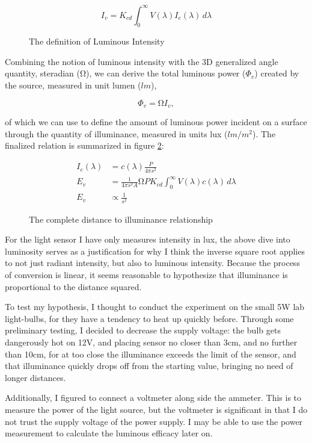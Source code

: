 \documentclass[a4paper,12pt]{article}
\begin{document}
\begin{figure}[h!]
    \[
     I_v = K_{cd} \int_{0}^{\infty} V(\lambda) I_e(\lambda) \, d\lambda
    \]
    \caption{The definition of Luminous Intensity}
    \label{eq:li}
\end{figure}

Combining the notion of luminous intensity with the 3D generalized angle quantity, steradian ($\si{\ohm}$), we can derive the total luminous power ($\Phi_v$) created by the source, measured in unit lumen ($\si{lm}$),

\[
    \Phi_v = \si{\ohm} I_v,
\]

of which we can use to define the amount of luminous power incident on a surface through the quantity of illuminance, measured in units lux ($\si{lm\per m^2}$). The finalized relation is summarized in figure \ref{eq:dti}:

\begin{figure}[h!]
 \centering
 \begin{align*}
 I_e(\lambda) &= c(\lambda) \frac{P}{4\pi s^2}\\
  E_v &= \frac{1}{4\pi s^2 A} \si{\ohm} P K_{cd} \int_{0}^{\infty} V(\lambda) c(\lambda) \, d\lambda\\
  E_v & \propto \frac{1}{s^2}
 \end{align*}
 \caption{The complete distance to illuminance relationship}
 \label{eq:dti}
\end{figure}

For the light sensor I have only measures intensity in lux, the above dive into luminosity serves as a justification for why I think the inverse square root applies to not just radiant intensity, but also to luminous intensity. Because the process of conversion is linear, it seems reasonable to hypothesize that illuminance is proportional to the distance squared.

To test my hypothesis, I thought to conduct the experiment on the small 5W lab light-bulbs, for they have a tendency to heat up quickly before. Through some preliminary testing, I decided to decrease the supply voltage: the bulb gets dangerously hot on 12V, and placing sensor no closer than 3cm, and no further than 10cm, for at too close the illuminance exceeds the limit of the sensor, and that illuminance quickly drops off from the starting value, bringing no need of longer distances. 

Additionally, I figured to connect a voltmeter along side the ammeter. This is to measure the power of the light source, but the voltmeter is significant in that I do not trust the supply voltage of the power supply. I may be able to use the power measurement to calculate the luminous efficacy later on.
\end{document}
